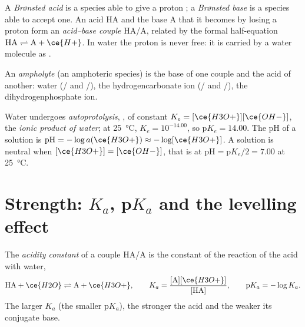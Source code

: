 \begin{definition}\label{def:b1:predominant-reaction:bronsted}
A \emph{Brønsted acid} is a species able to give a
proton ; a \emph{Brønsted base} is a species
able to accept one. An acid HA and the base A that it becomes by losing a
proton form an \emph{acid--base couple} HA/A,
related by the formal half-equation $\mathrm{HA} \rightleftharpoons
\mathrm{A} + \ce{H+}$. In water the proton is never free: it is carried
by a water molecule as .
\end{definition}

\begin{definition}[Ampholyte]\label{def:b1:predominant-reaction:ampholyte}
An \emph{ampholyte} (an amphoteric species) is the base
of one couple and the acid of another: water (/ and
/), the hydrogencarbonate ion (/
and /), the dihydrogenphosphate ion.
\end{definition}

\begin{definition}\label{def:b1:predominant-reaction:autoprotolysis}
Water undergoes \emph{autoprotolysis},
, of constant $K_e = [\ce{H3O+}][\ce{OH-}]$, the
\emph{ionic product of water}; at
\qty{25}{\celsius}, $K_e = 10^{-14.00}$, so $\mathrm{p}K_e = 14.00$. The pH
of a solution is $\mathrm{pH} = -\log a(\ce{H3O+}) \approx -\log[\ce{H3O+}]$.
A solution is neutral when $[\ce{H3O+}] = [\ce{OH-}]$, that is at
$\mathrm{pH} = \mathrm{p}K_e/2 = 7.00$ at \qty{25}{\celsius}.
\end{definition}

\section{Strength: \texorpdfstring{$K_a$}{Ka}, \texorpdfstring{p$K_a$}{pKa} and the levelling effect}

\begin{definition}\label{def:b1:predominant-reaction:acidity-constant}
The \emph{acidity constant} of a couple HA/A is
the constant of the reaction of the acid with water,
\[
  \mathrm{HA} + \ce{H2O} \rightleftharpoons \mathrm{A} + \ce{H3O+}, \qquad
  K_a = \frac{[\mathrm{A}][\ce{H3O+}]}{[\mathrm{HA}]}, \qquad
  \mathrm{p}K_a = -\log K_a .
\]
The larger $K_a$ (the smaller $\mathrm{p}K_a$), the stronger the acid and
the weaker its conjugate base.
\end{definition}

